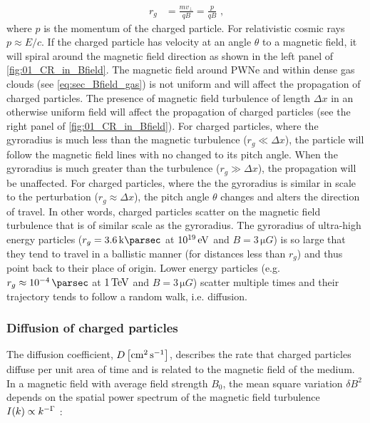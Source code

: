 \begin{equation}
    \begin{aligned}
    r_g&=\frac{mv_\perp}{qB}=\frac{p}{qB}\text{ ,}
    \end{aligned} \label{eq:chapter_1_gyroradius}
\end{equation}
\noindent where $p$ is the momentum of the charged particle. For relativistic cosmic rays $p\approx E/c$. If the charged particle has velocity at an angle $\theta$ to a magnetic field, it will spiral around the magnetic field direction as shown in the left panel of \autoref{fig:01_CR_in_Bfield}.
\newpar 
The magnetic field around PWNe and within dense gas clouds (see \autoref{eq:sec_Bfield_gas}) is not uniform and will affect the propagation of charged particles. The presence of magnetic field turbulence of length $\Delta x$ in an otherwise uniform field will affect the propagation of charged particles (see the right panel of \autoref{fig:01_CR_in_Bfield}). For charged particles, where the gyroradius is much less than the magnetic turbulence ($r_g\ll \Delta x$), the particle will follow the magnetic field lines with no changed to its pitch angle. When the gyroradius is much greater than the turbulence ($r_g\gg \Delta x$), the propagation will be unaffected. For charged particles, where the the gyroradius is similar in scale to the perturbation ($r_g\approx \Delta x$), the pitch angle $\theta$ changes and alters the direction of travel. In other words, charged particles scatter on the magnetic field turbulence that is of similar scale as the gyroradius.
\newpar
The gyroradius of ultra-high energy particles ($r_g=3.6\,\kpc$ at $10^{19}\,\si{\electronvolt}$ and $B=3\,\si{\micro G}$) is so large that they tend to travel in a ballistic manner (for distances less than $r_g$) and thus point back to their place of origin. Lower energy particles (e.g. $r_g\approx 10^{-4}\,\pc$ at $1\,\TeV$ and $B=3\,\si{\micro G}$) scatter multiple times and their trajectory tends to follow a random walk, i.e. diffusion.

\subsubsection{Diffusion of charged particles} 

The diffusion coefficient, $D\,\qty[\si{\centi\meter\squared\per\second}]$, describes the rate that charged particles diffuse per unit area of time and is related to the magnetic field of the medium. In a magnetic field with average field strength $B_0$, the mean square variation $\delta B^2$ depends on the spatial power spectrum of the magnetic field turbulence $I\qty(k)\propto k^{-\Gamma}$ \citep{1983RPPh...46..973D,2016MNRAS.461.3552N}:

